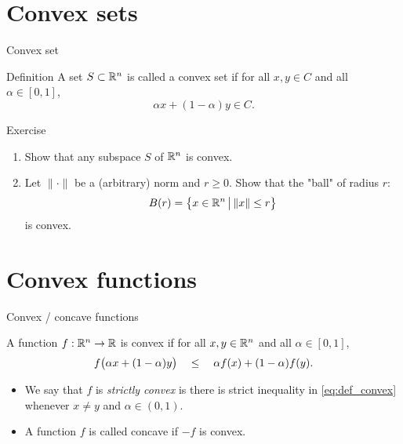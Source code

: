 \documentclass{beamer}
\begin{document}
\section{Convex sets}

\begin{frame}[t]{Convex set}
	\grid

	\vspace{-0.4cm}
	\begin{block}{Definition}
		A set $S \subset \mathbb{R}^n$ is called a convex set if for all $x,y \in C$ and all $\alpha \in [0,1]$,
		$$
		\alpha x + (1-\alpha) y \in C.
		$$
	\end{block}

\end{frame}

\begin{frame}[t]{Exercise}
	\grid

	\vspace{-0.3cm}
	\begin{enumerate}
		\item Show that any subspace $S$ of $\mathbb{R}^n$ is convex.
		\item Let $\| \cdot \|$ be a (arbitrary) norm and $r \geq 0$.
			Show that the "ball" of radius $r$:
			$$
			B(r) = \big\{ x \in \mathbb{R}^n \, \big| \, \|x\| \leq r \big\}
			$$
			is convex.
	\end{enumerate}

\end{frame}

\section{Convex functions}

\begin{frame}[t]{Convex / concave functions}
	\grid

	\vspace{-0.5cm}

	\begin{definition}
		A function $f: \mathbb{R}^n \to \mathbb{R}$ is convex if for all $x,y \in \mathbb{R}^n$ and all $\alpha \in [0,1]$,
		\begin{equation}\label{eq:def_convex}
			f\big(\alpha x + (1-\alpha) y\big) \ \ \ \leq \ \ \ \alpha f(x) + (1-\alpha) f(y).
	\vspace{-0.3cm}
		\end{equation}
	\end{definition}
	\vspace{-0.1cm}
	\pause
	\begin{itemize}
		\item We say that $f$ is \emph{strictly convex} is there is strict inequality in \eqref{eq:def_convex} whenever $x \neq y$ and $\alpha \in (0,1)$.
		\item A function $f$ is called concave if $-f$ is convex.
	\end{itemize}
\end{frame}
\end{document}
